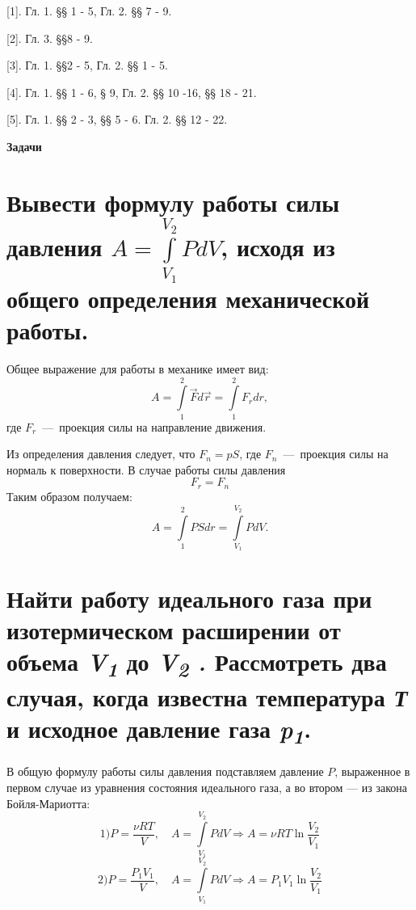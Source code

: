 {[}1{]}. Гл. 1. §§ 1 - 5, Гл. 2. §§ 7 - 9.

{[}2{]}. Гл. 3. §§8 - 9.

{[}3{]}. Гл. 1. §§2 - 5, Гл. 2. §§ 1 - 5.

{[}4{]}. Гл. 1. §§ 1 - 6, § 9, Гл. 2. §§ 10 -16, §§ 18 - 21.

{[}5{]}. Гл. 1. §§ 2 - 3, §§ 5 - 6. Гл. 2. §§ 12 - 22.

\textbf{Задачи}

\section{Вывести формулу работы силы давления $A=\int\limits_{V_1}^{V_2}PdV$, исходя из общего определения механической работы.}

\solving{}

Общее выражение для работы в механике имеет вид:
\begin{equation}
  A=\int\limits_1^2\vec{F}d\vec{r} = \int\limits_1^2 F_rdr,
\end{equation}
где $F_r$~---~проекция силы на направление движения.

Из определения давления следует, что $F_n = p S$,
где $F_n$~---~проекция силы на нормаль к поверхности.
В случае работы силы давления
\begin{equation}
  F_r = F_n
\end{equation}
Таким образом получаем:
\begin{equation}
  A=\int\limits_1^2PSdr = \int\limits_{V_1}^{V_2} PdV.
\end{equation}

\section{Найти работу идеального газа при изотермическом расширении
от объема \emph{V\textsubscript{1}} до \emph{V\textsubscript{2} .}
Рассмотреть два случая, когда известна температура \emph{Т} и исходное
давление газа \emph{p\textsubscript{1}}.}

\solving{}

В общую формулу работы силы давления подставляем давление $P$,
выраженное в первом случае из уравнения состояния идеального газа, а во
втором --- из закона Бойля-Мариотта:
\begin{equation}
  1) P = \frac{\nu RT}{V}, \quad A = \int\limits_{V_1}^{V_2}PdV \Rightarrow A = \nu RT\ln\frac{V_2}{V_1}
\end{equation}
\begin{equation}
  2) P = \frac{P_1V_1}{V}, \quad A = \int\limits_{V_1}^{V_2}PdV \Rightarrow A = P_1V_1\ln\frac{V_2}{V_1}
\end{equation}

